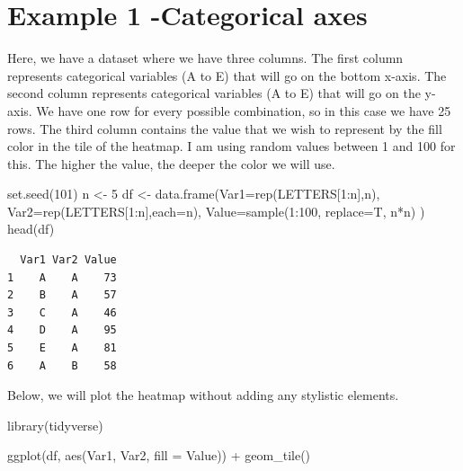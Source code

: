 \documentclass[
  letterpaper,
  DIV=11,
  numbers=noendperiod]{scrreprt}
\newenvironment{Shaded}{\begin{snugshade}}{\end{snugshade}}
\newcommand{\AttributeTok}[1]{\textcolor[rgb]{0.40,0.45,0.13}{#1}}
\newcommand{\DecValTok}[1]{\textcolor[rgb]{0.68,0.00,0.00}{#1}}
\newcommand{\FunctionTok}[1]{\textcolor[rgb]{0.28,0.35,0.67}{#1}}
\newcommand{\NormalTok}[1]{\textcolor[rgb]{0.00,0.23,0.31}{#1}}
\newcommand{\OtherTok}[1]{\textcolor[rgb]{0.00,0.23,0.31}{#1}}
\newcommand{\SpecialCharTok}[1]{\textcolor[rgb]{0.37,0.37,0.37}{#1}}
\begin{document}
\hypertarget{example-1--categorical-axes}{%
\section{\texorpdfstring{\textbf{Example 1 -Categorical
axes}}{Example 1 -Categorical axes}}\label{example-1--categorical-axes}}

Here, we have a dataset where we have three columns. The first column
represents categorical variables (A to E) that will go on the bottom
x-axis. The second column represents categorical variables (A to E) that
will go on the y-axis. We have one row for every possible combination,
so in this case we have 25 rows. The third column contains the value
that we wish to represent by the fill color in the tile of the heatmap.
I am using random values between 1 and 100 for this. The higher the
value, the deeper the color we will use.

\begin{Shaded}
\begin{Highlighting}[]
\FunctionTok{set.seed}\NormalTok{(}\DecValTok{101}\NormalTok{)}
\NormalTok{n }\OtherTok{\textless{}{-}} \DecValTok{5}
\NormalTok{df }\OtherTok{\textless{}{-}} \FunctionTok{data.frame}\NormalTok{(}\AttributeTok{Var1=}\FunctionTok{rep}\NormalTok{(LETTERS[}\DecValTok{1}\SpecialCharTok{:}\NormalTok{n],n),}
                 \AttributeTok{Var2=}\FunctionTok{rep}\NormalTok{(LETTERS[}\DecValTok{1}\SpecialCharTok{:}\NormalTok{n],}\AttributeTok{each=}\NormalTok{n),}
                 \AttributeTok{Value=}\FunctionTok{sample}\NormalTok{(}\DecValTok{1}\SpecialCharTok{:}\DecValTok{100}\NormalTok{, }\AttributeTok{replace=}\NormalTok{T, n}\SpecialCharTok{*}\NormalTok{n)}
\NormalTok{)}
\FunctionTok{head}\NormalTok{(df)}
\end{Highlighting}
\end{Shaded}

\begin{verbatim}
  Var1 Var2 Value
1    A    A    73
2    B    A    57
3    C    A    46
4    D    A    95
5    E    A    81
6    A    B    58
\end{verbatim}

Below, we will plot the heatmap without adding any stylistic elements.

\begin{Shaded}
\begin{Highlighting}[]
\FunctionTok{library}\NormalTok{(tidyverse)}

\FunctionTok{ggplot}\NormalTok{(df, }\FunctionTok{aes}\NormalTok{(Var1, Var2, }\AttributeTok{fill =}\NormalTok{ Value)) }\SpecialCharTok{+} 
  \FunctionTok{geom\_tile}\NormalTok{() }
\end{Highlighting}
\end{Shaded}
\end{document}
